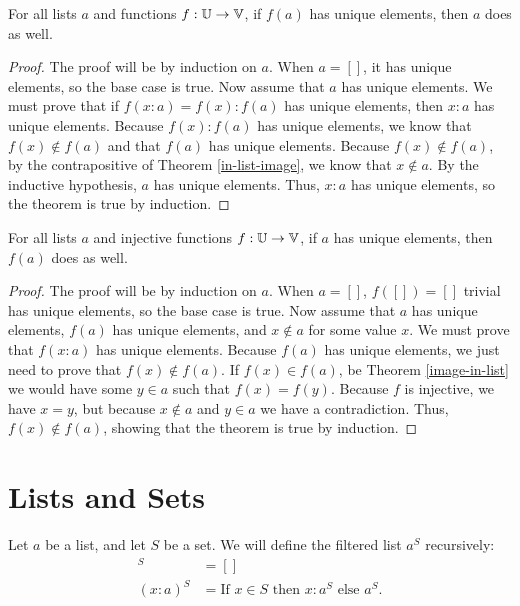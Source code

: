 \documentclass[../math.tex]{subfiles}
\begin{document}
\begin{theorem} \label{list-image-unique}
    For all lists $a$ and functions $f : \mathbb{U} \to \mathbb{V}$, if $f(a)$ has unique
    elements, then $a$ does as well.
\end{theorem}
\begin{proof}
    The proof will be by induction on $a$.  When $a = []$, it has unique
    elements, so the base case is true.  Now assume that $a$ has unique
    elements.  We must prove that if $f(x : a) = f(x) : f(a)$ has unique
    elements, then $x : a$ has unique elements.  Because $f(x) : f(a)$ has
    unique elements, we know that $f(x) \notin f(a)$ and that $f(a)$ has unique
    elements.  Because $f(x) \notin f(a)$, by the contrapositive of Theorem
    \ref{in-list-image}, we know that $x \notin a$.  By the inductive
    hypothesis, $a$ has unique elements.  Thus, $x : a$ has unique elements, so
    the theorem is true by induction.
\end{proof}

\begin{theorem} \label{list-image-unique-inj}
    For all lists $a$ and injective functions $f : \mathbb{U} \to \mathbb{V}$, if $a$ has unique
    elements, then $f(a)$ does as well.
\end{theorem}
\begin{proof}
    The proof will be by induction on $a$.  When $a = []$, $f([]) = []$ trivial
    has unique elements, so the base case is true.  Now assume that $a$ has
    unique elements, $f(a)$ has unique elements, and $x \notin a$ for some value
    $x$.  We must prove that $f(x : a)$ has unique elements.  Because $f(a)$ has
    unique elements, we just need to prove that $f(x) \notin f(a)$.  If $f(x)
    \in f(a)$, be Theorem \ref{image-in-list} we would have some $y \in a$ such
    that $f(x) = f(y)$.  Because $f$ is injective, we have $x = y$, but because
    $x \notin a$ and $y \in a$ we have a contradiction.  Thus, $f(x) \notin
    f(a)$, showing that the theorem is true by induction.
\end{proof}

\section{Lists and Sets}

\begin{definition}
    Let $a$ be a list, and let $S$ be a set.  We will define the filtered list
    $a^S$ recursively:
    \begin{align*}
             []^S &= [] \\
        (x : a)^S &= \text{If $x \in S$ then $x : a^S$ else $a^S$}.
    \end{align*}
\end{definition}
\end{document}
